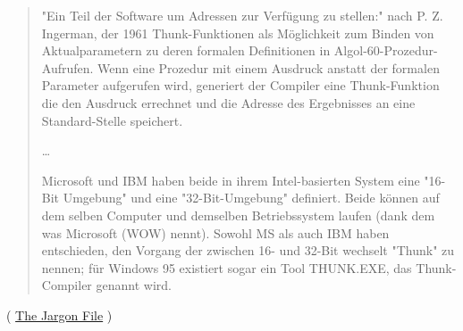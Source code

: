 \begin{framed}
\begin{quotation}
"Ein Teil der Software um Adressen zur Verfügung zu stellen:" nach P. Z. Ingerman,
der 1961 Thunk-Funktionen als Möglichkeit zum Binden von Aktualparametern zu deren
formalen Definitionen in Algol-60-Prozedur-Aufrufen. Wenn eine Prozedur mit einem Ausdruck anstatt
der formalen Parameter aufgerufen wird, generiert der Compiler eine Thunk-Funktion die den Ausdruck
errechnet und die Adresse des Ergebnisses an eine Standard-Stelle speichert.

\dots

Microsoft und IBM haben beide in ihrem Intel-basierten System eine "16-Bit Umgebung"
und eine "32-Bit-Umgebung" definiert. Beide können auf dem selben Computer und demselben
Betriebssystem laufen (dank dem was Microsoft  (WOW) nennt).
Sowohl MS als auch IBM haben entschieden, den Vorgang der zwischen 16- und 32-Bit wechselt
"Thunk" zu nennen; für Windows 95 existiert sogar ein Tool THUNK.EXE, das Thunk-Compiler
genannt wird.\end{quotation}
\end{framed}
( \href{http://go.yurichev.com/17362}{The Jargon File} )

